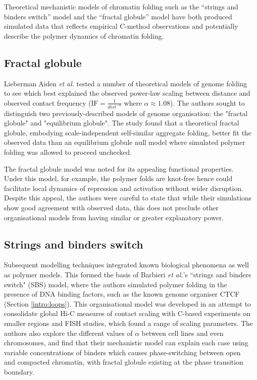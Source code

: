 \documentclass[a4paper,11pt,oneside]{book}
\begin{document}
Theoretical mechanistic models of chromatin folding such as the
``strings and binders switch'' model\cite{Barbieri2012} and the ``fractal
globule'' model\cite{Lieberman2009, Mirny2011, Grosberg1988a} have both produced simulated data
that reflects empirical C-method observations and potentially describe the polymer
dynamics of chromatin folding.

\subsection{Fractal globule}
Lieberman Aiden \emph{ et al.}\cite{Lieberman2009} tested a number of theoretical models of genome folding to see which best explained the observed power-law scaling between distance and observed contact frequency ($\textrm{IF} =  \frac{1}{dist^{-\alpha}}$ where $\alpha \approx 1.08$).  The authors sought to distinguish two previously-described models of genome organisation: the "fractal globule" and "equilibrium globule". The study found that a theoretical fractal globule, embodying scale-independent self-similar aggregate folding, better fit the observed data than an equilibrium globule null model where simulated polymer folding was allowed to proceed unchecked.


The fractal globule model was noted for its appealing functional properties. Under this model, for example, the polymer folds are knot-free hence could facilitate local dynamics of repression and activation without wider disruption. Despite this appeal, the authors were careful to state that while their simulations show good agreement with observed data, this does not preclude other organisational models from having similar or greater explanatory power.\cite{Lieberman2009}

\subsection{Strings and binders switch}\label{intro:sbs}

Subsequent modelling techniques integrated known biological phenomena as well as polymer models. This formed the basis of Barbieri \emph{et al.}'s\cite{Barbieri2012} ``strings and binders switch" (SBS) model, where the authors simulated polymer folding in the presence of DNA binding factors, such as the known genome organiser CTCF (Section \ref{intro:loops}). This organisational model was developed in an attempt to consolidate global Hi-C measures of contact scaling with C-based experiments on smaller regions and FISH studies, which found a range of scaling parameters. The authors also explore the different values of $\alpha$ between cell lines and even chromosomes, and find that their mechanistic model can explain each case using variable concentrations of binders which causes phase-switching between open and compacted chromatin, with fractal globule existing at the phase transition boundary.
\end{document}
